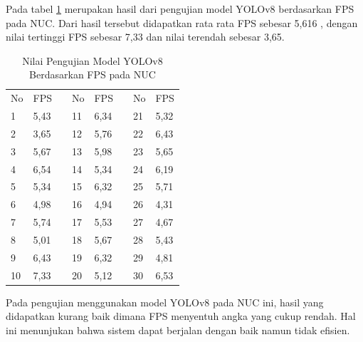 Pada tabel \ref{tb:TabelYolov8NUC} merupakan hasil dari pengujian model YOLOv8 berdasarkan FPS pada NUC. Dari hasil tersebut didapatkan rata rata FPS sebesar 5,616 , dengan nilai tertinggi FPS sebesar 7,33 dan nilai terendah sebesar 3,65.

\begin{table}[H]
  \caption{Nilai Pengujian Model YOLOv8 Berdasarkan FPS pada NUC} 
  \label{tb:TabelYolov8NUC}
  \centering
  \begin{tabular}{|l|l|l|l|l|l|l|l|}
  \cline{1-2} \cline{4-5} \cline{7-8}
  No & FPS  &  & No & FPS  &  & No & FPS  \\ \cline{1-2} \cline{4-5} \cline{7-8} 
  1  & 5,43 &  & 11 & 6,34 &  & 21 & 5,32 \\ \cline{1-2} \cline{4-5} \cline{7-8} 
  2  & 3,65 &  & 12 & 5,76 &  & 22 & 6,43 \\ \cline{1-2} \cline{4-5} \cline{7-8} 
  3  & 5,67 &  & 13 & 5,98 &  & 23 & 5,65 \\ \cline{1-2} \cline{4-5} \cline{7-8} 
  4  & 6,54 &  & 14 & 5,34 &  & 24 & 6,19 \\ \cline{1-2} \cline{4-5} \cline{7-8} 
  5  & 5,34 &  & 15 & 6,32 &  & 25 & 5,71 \\ \cline{1-2} \cline{4-5} \cline{7-8} 
  6  & 4,98 &  & 16 & 4,94 &  & 26 & 4,31 \\ \cline{1-2} \cline{4-5} \cline{7-8} 
  7  & 5,74 &  & 17 & 5,53 &  & 27 & 4,67 \\ \cline{1-2} \cline{4-5} \cline{7-8} 
  8  & 5,01 &  & 18 & 5,67 &  & 28 & 5,43 \\ \cline{1-2} \cline{4-5} \cline{7-8} 
  9  & 6,43 &  & 19 & 6,32 &  & 29 & 4,81 \\ \cline{1-2} \cline{4-5} \cline{7-8} 
  10 & 7,33 &  & 20 & 5,12 &  & 30 & 6,53 \\ \cline{1-2} \cline{4-5} \cline{7-8} 
  \end{tabular}
\end{table}

Pada pengujian menggunakan model YOLOv8 pada NUC ini, hasil yang didapatkan kurang baik dimana FPS menyentuh angka yang cukup rendah. Hal ini menunjukan bahwa sistem dapat berjalan dengan baik namun tidak efisien.



